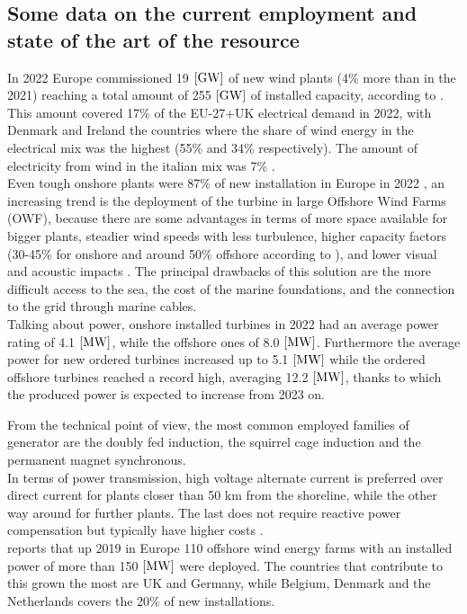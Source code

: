 \subsection{Some data on the current employment and state of the art of the resource}
In 2022 Europe commissioned 19 $\left[\si{\giga\watt}\right]$ of new wind plants (4\% more than in the 2021) reaching a total amount of 255 $\left[\si{\giga\watt}\right]$ of installed capacity, according to \cite{wind_europe_data_2022}. This amount covered 17\% of the EU-27+UK electrical demand in 2022, with Denmark and Ireland the countries where the share of wind energy in the electrical mix was the highest (55\% and 34\% respectively). The amount of electricity from wind in the italian mix was 7\% \cite{wind_europe_data_2022}.\\
Even tough onshore plants were 87\% of new installation in Europe in 2022 \cite{wind_europe_data_2022}, an increasing trend is the deployment of the turbine in large Offshore Wind Farms (OWF), because there are some advantages in terms of more space available for bigger plants, steadier wind speeds with less turbulence, higher capacity factors (30-45\% for onshore and around 50\% offshore according to \cite{wind_europe_data_2022}), and lower visual and acoustic impacts \cite{current_staus_and_future_trends_of_offshore_wind_power_in_europe}. The principal drawbacks of this solution are the more difficult access to the sea, the cost of the marine foundations, and the connection to the grid through marine cables.  \\
Talking about power, onshore installed turbines in 2022 had an average power rating of 4.1 $\left[\si{\mega\watt}\right]$, while the offshore ones of 8.0 $\left[\si{\mega\watt}\right]$. Furthermore the average power for new ordered turbines increased up to 5.1 $\left[\si{\mega\watt}\right]$ while the ordered offshore turbines reached a record high, averaging 12.2 $\left[\si{\mega\watt}\right]$, thanks to which the produced power is expected to increase from 2023 on.

From the technical point of view, the most common employed families of generator are the doubly fed induction, the squirrel cage induction and the permanent magnet synchronous.\\
In terms of power transmission, high voltage alternate current is preferred over direct current for plants closer than 50 km from the shoreline, while the other way around for further plants. The last does not require reactive power compensation but typically have higher costs \cite{current_staus_and_future_trends_of_offshore_wind_power_in_europe}.\\
\cite{current_staus_and_future_trends_of_offshore_wind_power_in_europe} reports that up 2019 in Europe 110 offshore wind energy farms with an installed power of more than 150 $\left[\si{\mega\watt}\right]$ were deployed. The countries that contribute to this grown the most are UK and Germany, while Belgium, Denmark and the Netherlands covers the 20\% of new installations.

